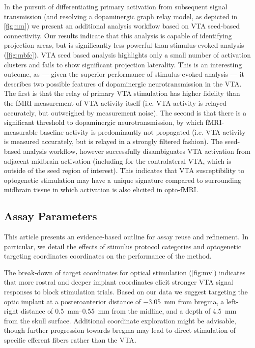 In the pursuit of differentiating primary activation from subsequent signal transmission (and resolving a dopaminergic graph relay model, as depicted in \cref{fig:nm}) we present an additional analysis workflow based on VTA seed-based connectivity.
Our results indicate that this analysis is capable of identifying projection areas, but is significantly less powerful than stimulus-evoked analysis (\cref{fig:mbfc}).
VTA seed based analysis highlights only a small number of activation clusters and fails to show significant projection laterality.
This is an interesting outcome, as --- given the superior performance of stimulus-evoked analysis --- it describes two possible features of dopaminergic neurotransmission in the VTA.
The first is that the relay of primary VTA stimulation has higher fidelity than the fMRI measurement of VTA activity itself (i.e. VTA activity is relayed accurately, but outweighed by measurement noise).
The second is that there is a significant threshold to dopaminergic neurotransmission, by which fMRI-measurable baseline activity is predominantly not propagated (i.e. VTA activity is measured accurately, but is relayed in a strongly filtered fashion).
The seed-based analysis workflow, however successfully disambiguates VTA activation from adjacent midbrain activation (including for the contralateral VTA, which is outside of the seed region of interest).
This indicates that VTA susceptibility to optogenetic stimulation may have a unique signature compared to surrounding midbrain tissue in which activation is also elicited in opto-fMRI.

\subsection{Assay Parameters}

This article presents an evidence-based outline for assay reuse and refinement.
In particular, we detail the effects of stimulus protocol categories and optogenetic targeting coordinates coordinates on the performance of the method.

The break-down of target coordinates for optical stimulation (\cref{fig:mv}) indicates that more rostral and deeper implant coordinates elicit stronger VTA signal responses to block stimulation trials.
Based on our data we suggest targeting the optic implant at
a posteroanterior distance of \SI{-3.05}{\milli\meter} from bregma,
a left-right distance of \SIrange{0.5}{0.55}{\milli\meter} from the midline,
and a depth of \SI{4.5}{\milli\meter} from the skull surface.
Additional coordinate exploration might be advisable, though further progression towards bregma may lead to direct stimulation of specific efferent fibers rather than the VTA.

